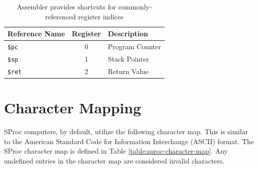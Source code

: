 \documentclass{article}
\begin{document}
\begin{table}[h!]
	\centering
	\begin{tabular}{l|cl}
		\hline
		Reference Name & Register & Description \\
		\hline
		\texttt{\$pc} & 0 & Program Counter \\
		\texttt{\$sp} & 1 & Stack Pointer \\
		\texttt{\$ret} & 2 & Return Value \\
		\hline
	\end{tabular}
	\caption{Assembler provides shortcuts for commonly-referenced register indices}
	\label{table:assembler-register-references}
\end{table}

\pagebreak

\section{Character Mapping}
\label{sec:character-map}

SProc computers, by default, utilize the following character map. This is similar to the American Standard Code for Information Interchange (ASCII) format. The SProc character map is defined in Table \ref{table:sproc-character-map}. Any undefined entries in the character map are considered invalid characters.

\newcommand{\charmap}[1]{\texttt{#1}}

\newcommand{\charslash}{\texttt{\char`\\}}

\newcommand{\charmapescape}[1]{\charmap{\texttt{\charslash#1}}}
\end{document}
